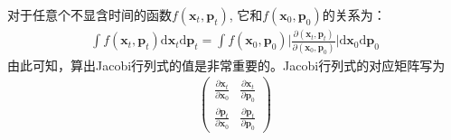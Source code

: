 \documentclass[12pt]{article}
\begin{document}
    对于任意个不显含时间的函数$f(\bm{x}_t,\bm{p}_t)$, 它和$f(\bm{x}_0,\bm{p}_0)$的关系为：
    \begin{equation}\begin{aligned}
        \int f(\bm{x}_t,\bm{p}_t) \mathrm{d}\bm{x}_t\mathrm{d}\bm{p}_t = \int f(\bm{x}_0,\bm{p}_0)\bigg|\frac {\partial (\bm{x}_t, \bm{p}_t)}{\partial (\bm{x}_0,\bm{p}_0)}\bigg| \mathrm{d}\bm{x}_0 \mathrm{d}\bm{p}_0
    \end{aligned}\end{equation}
    由此可知，算出Jacobi行列式的值是非常重要的。Jacobi行列式的对应矩阵写为
    \begin{equation}\begin{aligned}
        \begin{pmatrix}
            \frac {\partial \bm{x}_t}{\partial \bm{x}_0} & \frac {\partial \bm{x}_t}{\partial \bm{p}_0}\\
            \frac {\partial \bm{p}_t}{\partial \bm{x}_0} & \frac {\partial \bm{p}_t}{\partial \bm{p}_0}
        \end{pmatrix}
    \end{aligned}\end{equation}
\end{document}
